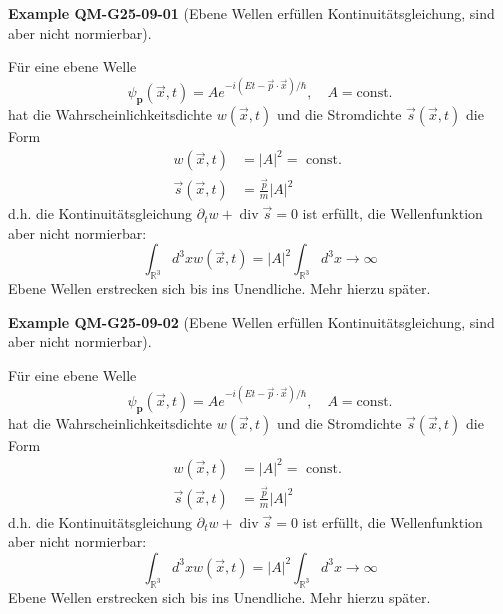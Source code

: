 \documentclass[10pt, letterpaper]{article}
\newcommand{\CustomHeading}[3]{%
  \par\medskip\noindent%
  \textbf{#1 #2} \textnormal{(#3)}.\enskip%
}
\newenvironment{EXA}[2]{\CustomHeading{Example}{#1}{#2}}{}
\begin{document}
\begin{EXA}{QM-G25-09-01}{Ebene Wellen erfüllen Kontinuitätsgleichung, sind aber nicht normierbar}
Für eine ebene Welle
$$
\psi_{\mathbf{p}}(\vec{x}, t)=A e^{-i(E t-\vec{p} \cdot \vec{x}) / \hbar}, \quad A=\mathrm{const} .
$$
hat die Wahrscheinlichkeitsdichte $w(\vec{x}, t)$ und die Stromdichte $\vec{s}(\vec{x}, t)$ die Form
$$
\begin{aligned}
w(\vec{x}, t) & =|A|^{2}=\text { const. } \\
\vec{s}(\vec{x}, t) & =\frac{\vec{p}}{m}|A|^{2}
\end{aligned}
$$
d.h. die Kontinuitätsgleichung $\partial_{t} w+\operatorname{div} \vec{s}=0$ ist erfüllt, die Wellenfunktion aber nicht normierbar:
$$
\int_{\mathbb{R}^{3}} d^{3} x w(\vec{x}, t)=|A|^{2} \int_{\mathbb{R}^{3}} d^{3} x \rightarrow \infty
$$
Ebene Wellen erstrecken sich bis ins Unendliche. Mehr hierzu später.
\end{EXA}

\begin{EXA}{QM-G25-09-02}{Ebene Wellen erfüllen Kontinuitätsgleichung, sind aber nicht normierbar}
Für eine ebene Welle
$$
\psi_{\mathbf{p}}(\vec{x}, t)=A e^{-i(E t-\vec{p} \cdot \vec{x}) / \hbar}, \quad A=\mathrm{const} .
$$
hat die Wahrscheinlichkeitsdichte $w(\vec{x}, t)$ und die Stromdichte $\vec{s}(\vec{x}, t)$ die Form
$$
\begin{aligned}
w(\vec{x}, t) & =|A|^{2}=\text { const. } \\
\vec{s}(\vec{x}, t) & =\frac{\vec{p}}{m}|A|^{2}
\end{aligned}
$$
d.h. die Kontinuitätsgleichung $\partial_{t} w+\operatorname{div} \vec{s}=0$ ist erfüllt, die Wellenfunktion aber nicht normierbar:
$$
\int_{\mathbb{R}^{3}} d^{3} x w(\vec{x}, t)=|A|^{2} \int_{\mathbb{R}^{3}} d^{3} x \rightarrow \infty
$$
Ebene Wellen erstrecken sich bis ins Unendliche. Mehr hierzu später.
\end{EXA}
\end{document}
